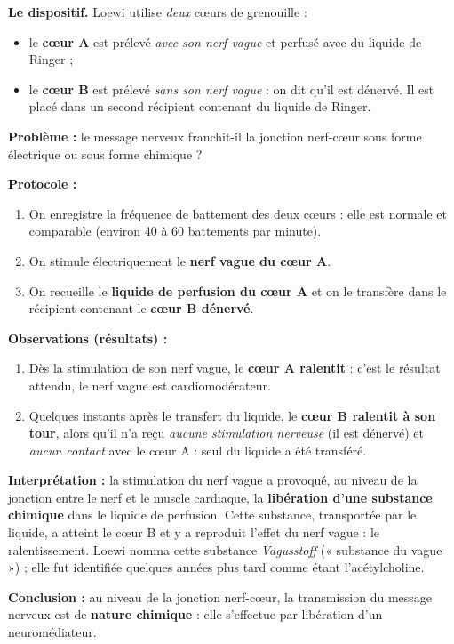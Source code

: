 \documentclass[11pt]{article}
\newcommand{\cle}[1]{{\popxbold\color{popdark}#1}}
\begin{document}
\textbf{Le dispositif.} Loewi utilise \emph{deux} cœurs de grenouille :

\begin{itemize}
\item le \textbf{cœur A} est prélevé \emph{avec son nerf vague} et perfusé avec du liquide de Ringer ;
\item le \textbf{cœur B} est prélevé \emph{sans son nerf vague} : on dit qu'il est \cle{dénervé}. Il est placé dans un second récipient contenant du liquide de Ringer.
\end{itemize}

\begin{experience}
\textbf{Problème :} le message nerveux franchit-il la jonction nerf-cœur sous forme électrique ou sous forme chimique ?

\textbf{Protocole :}
\begin{enumerate}
\item On enregistre la fréquence de battement des deux cœurs : elle est normale et comparable (environ 40 à 60 battements par minute).
\item On stimule électriquement le \textbf{nerf vague du cœur A}.
\item On recueille le \textbf{liquide de perfusion du cœur A} et on le transfère dans le récipient contenant le \textbf{cœur B dénervé}.
\end{enumerate}

\textbf{Observations (résultats) :}
\begin{enumerate}
\item Dès la stimulation de son nerf vague, le \textbf{cœur A ralentit} : c'est le résultat attendu, le nerf vague est cardiomodérateur.
\item Quelques instants après le transfert du liquide, le \textbf{cœur B ralentit à son tour}, alors qu'il n'a reçu \emph{aucune stimulation nerveuse} (il est dénervé) et \emph{aucun contact} avec le cœur A : seul du liquide a été transféré.
\end{enumerate}

\textbf{Interprétation :} la stimulation du nerf vague a provoqué, au niveau de la jonction entre le nerf et le muscle cardiaque, la \textbf{libération d'une substance chimique} dans le liquide de perfusion. Cette substance, transportée par le liquide, a atteint le cœur B et y a reproduit l'effet du nerf vague : le ralentissement. Loewi nomma cette substance \emph{Vagusstoff} (« substance du vague ») ; elle fut identifiée quelques années plus tard comme étant l'\cle{acétylcholine}.

\textbf{Conclusion :} au niveau de la jonction nerf-cœur, la transmission du message nerveux est de \textbf{nature chimique} : elle s'effectue par libération d'un neuromédiateur.
\end{experience}
\end{document}
